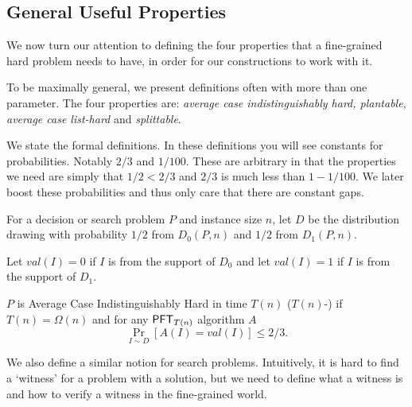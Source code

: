 \subsection{General Useful Properties}
We now turn our attention to defining the four properties that a fine-grained hard problem needs to have, in order for our constructions to work with it.

To be maximally general, we present definitions often with more than one parameter. The four properties are: {\em average case indistinguishably hard, plantable, average case list-hard} and {\em splittable}. 


We state the formal definitions. In these definitions you will see constants for probabilities. Notably $2/3$ and $1/100$. These are arbitrary in that the properties we need are simply that $1/2 <2/3$ and $2/3$ is much less than $1-1/100$. We later boost these probabilities and thus only care that there are constant gaps.


\begin{definition}
\label{def:acih}
For a decision or search problem $P$ and instance size $n$, let $D$ be the distribution drawing with probability $1/2$ from $D_{0}(P,n)$ and $1/2$ from $D_{1}(P,n)$.

Let $val(I)=0$ if $I$ is from the support of $D_0$ and let  $val(I)=1$ if $I$ is from the support of $D_1$.

$P$ is Average Case Indistinguishably Hard in time $T(n)$ ($T(n)$-\ACIH) if $T(n)=\Omega(n)$ and
for any  $\mathsf{PFT}_{ T(n)}$ algorithm $A$
\[ \Pr_{I \sim D}[A(I) = val(I)] \le 2/3 .\]
\end{definition}

We also define a similar notion for search problems. Intuitively, it is hard to find a `witness' for a problem with a solution, but we need to define what a witness is and how to verify a witness in the fine-grained world.

